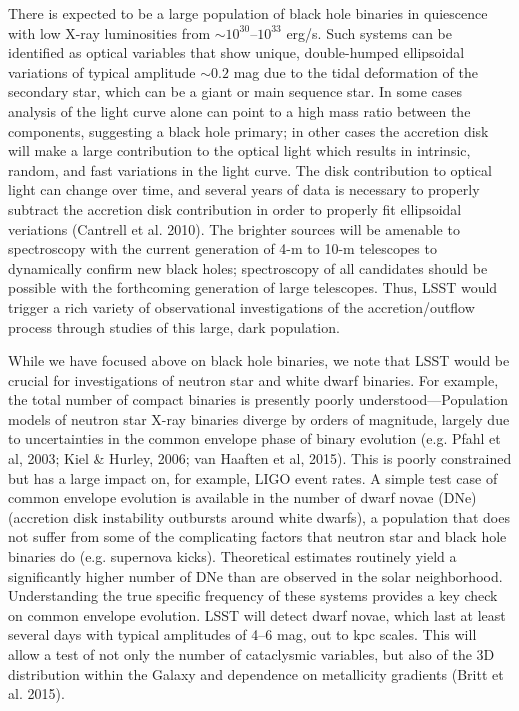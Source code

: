 There is expected to be a large population of black hole binaries in quiescence
with low X-ray luminosities from $\sim 10^{30}$--$10^{33}$ erg/s.
Such systems can be identified as optical variables that show unique,
double-humped ellipsoidal variations of typical amplitude $\sim 0.2$
mag due to the tidal deformation of the secondary star, which can be a
giant or main sequence star. In some cases analysis of the light curve
alone can point to a high mass ratio between the components,
suggesting a black hole primary; in other cases the accretion disk
will make a large contribution to the optical light which results in
intrinsic, random, and fast variations in the light curve. The disk
contribution to optical light can change over time, and several years
of data is necessary to properly subtract the accretion disk
contribution in order to properly fit ellipsoidal veriations (Cantrell
et al. 2010). The brighter sources will be amenable to spectroscopy
with the current generation of 4-m to 10-m telescopes to dynamically
confirm new black holes; spectroscopy of all candidates should be
possible with the forthcoming generation of large telescopes. Thus,
LSST would trigger a rich variety of observational investigations of
the accretion/outflow process through studies of this large, dark
population.

While we have focused above on black hole binaries, we note that LSST
would be crucial for investigations of neutron star and white dwarf
binaries. For example, the total number of compact binaries 
is presently
poorly understood---Population models of neutron star X-ray binaries diverge by orders 
of magnitude, largely due to uncertainties in the common envelope phase of binary evolution (e.g. Pfahl et al, 2003; Kiel & Hurley, 2006; van Haaften et al, 2015). This is
poorly constrained but has a large impact on, for example, LIGO event
rates. A simple test case of common envelope evolution is available in the number of dwarf novae (DNe) 
(accretion disk instability outbursts around white dwarfs), a population that does not suffer from
some of the complicating factors that neutron star and black hole binaries do (e.g. supernova kicks). 
Theoretical estimates routinely yield a significantly higher number of DNe than are observed in the solar
neighborhood. Understanding the true specific frequency of these
systems provides a key check on common envelope evolution.  LSST will detect dwarf novae, which last at least several days
with typical amplitudes of 4--6 mag,
out to kpc scales. This will allow a test of not only the number of
cataclysmic variables, but also of the 3D distribution within the
Galaxy and dependence on metallicity gradients (Britt et al. 2015).

